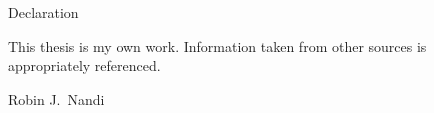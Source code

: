 {\bf \centerline{\Large Declaration}}

\vspace{1cm}

This thesis is my own work. Information taken from other sources is
appropriately referenced.

\vspace{0.5cm}

\hfill Robin J.\ Nandi
